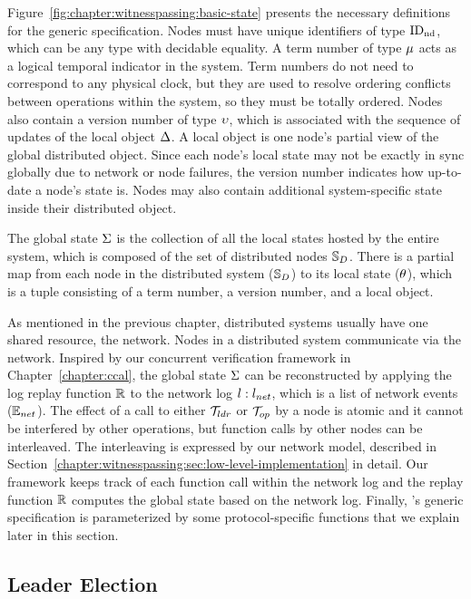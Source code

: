 Figure~\ref{fig:chapter:witnesspassing:basic-state} presents the necessary definitions for the
generic specification.
Nodes must have unique identifiers of type $\mathrm{ID_{nd}}$, which can be any type with decidable equality.
A term number of type $\mu$ acts as a logical temporal indicator in the system.
Term numbers do not need to correspond to any physical clock,
but they are used to resolve ordering conflicts between operations within the system,
so they must be totally ordered.
Nodes also contain a version number of type $\upsilon$, which is associated with the sequence of updates
of the local object $\Delta$.
A local object is one node's partial view of the global distributed object.
Since each node's local state may not be exactly in sync globally due to network or
node failures, the version number indicates how up-to-date a node's state is.
Nodes may also contain additional system-specific state inside their distributed object.

The global state $\Sigma$ is the collection of all the local states hosted by the
entire system, which is composed of the set of distributed nodes $\mathbb{S}_{D}$.
There is a partial map from each node in the distributed system ($\mathbb{S}_{D}$)
to its local state ($\theta$), which is a tuple consisting of a term number,
a version number, and a local object.

As mentioned in the previous chapter, 
distributed systems usually have one shared resource, the network. 
Nodes in a distributed system communicate via the network. 
Inspired by our concurrent verification framework in Chapter~\ref{chapter:ccal},
the global state $\Sigma$ can be reconstructed by
applying the log replay function $\mathbb{R}$ to the
network log $l : {l_{net}}$, which is a list of network events (${\mathbb{E}_{net}}$).
The effect of a call to either $\mathcal{T}_{ldr}$ or $\mathcal{T}_{op}$ by a node is atomic 
and it cannot be interfered by other operations, 
but function calls by other nodes can be interleaved.
The interleaving is expressed by our network model, described in Section~\ref{chapter:witnesspassing:sec:low-level-implementation} in detail.
Our framework keeps track of each function call
within the network log and the replay function $\mathbb{R}$ computes the
global state based on the network log.
Finally, \sysname{}'s generic specification is parameterized by some protocol-specific
functions that we explain later in this section.


\subsection{Leader Election}
\label{chapter:witnesspassing:subsec:leader-election}

